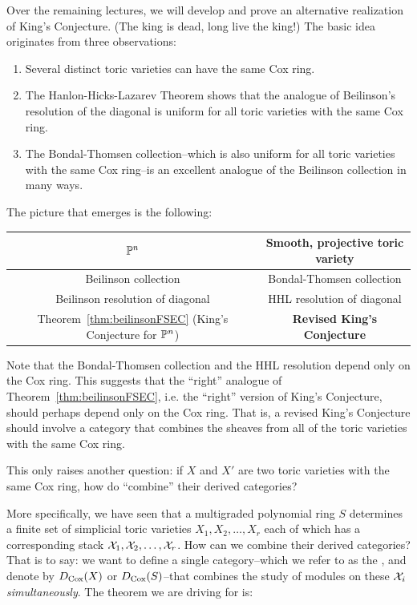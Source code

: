 \documentclass{amsart}
\begin{document}
Over the remaining lectures, we will develop and prove an alternative
realization of King’s Conjecture.  (The king is dead, long live the king!)
The basic idea originates from three observations:
\begin{enumerate}
    \item Several distinct toric varieties can have the same Cox ring.
    \item  The Hanlon-Hicks-Lazarev Theorem shows that the analogue of Beilinson's resolution of the diagonal is uniform for all toric varieties with the same Cox ring.
    \item  The Bondal-Thomsen collection--which is also uniform for all toric varieties with the same Cox ring--is an excellent analogue of the Beilinson collection in many ways.
\end{enumerate}
The picture that emerges is the following:
\begin{center}
\begin{tabular}{c|c}
    $\mathbb P^n$ & Smooth, projective toric variety \\ \hline
Beilinson collection   &  Bondal-Thomsen collection\\
Beilinson resolution of diagonal & HHL resolution of diagonal\\
Theorem~\ref{thm:beilinsonFSEC} (King's Conjecture for $\mathbb P^n$)    &  {\bf Revised King's Conjecture}
\end{tabular}
\end{center}
Note that the Bondal-Thomsen collection and the HHL resolution depend only on the Cox ring.  This suggests that the ``right'' analogue of Theorem~\ref{thm:beilinsonFSEC}, i.e. the ``right'' version of King's Conjecture, should perhaps depend only on the Cox ring. That is, a revised King's Conjecture should involve a category that combines the sheaves from all of the toric varieties with the same Cox ring.

This only raises another question:  if $X$ and $X'$ are two toric varieties with the same Cox ring, how do ``combine'' their derived categories?



More specifically, we have seen that a multigraded polynomial ring $S$ determines a finite set of simplicial toric varieties $X_1, X_2, \dots, X_r$ each of which has a corresponding stack $\mathcal X_1, \mathcal X_2, \dots, \mathcal X_r$.
How can we combine their derived categories?  That is to say: we want to define a single category--which we refer to
 as the , and denote by $D_{\operatorname{Cox}}(X)$ or $D_{\operatorname{Cox}}(S)$--that combines the study of modules on these $\mathcal X_i$ {\em simultaneously}.
The theorem we are driving for is:
\end{document}
